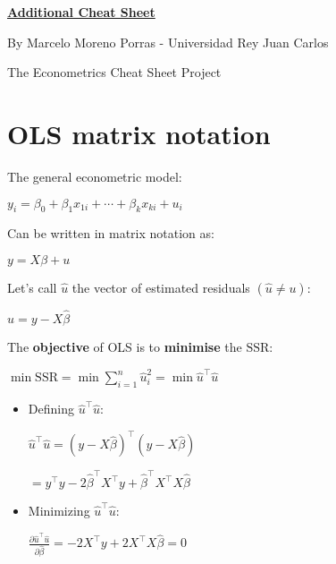 \documentclass[10pt, a4paper, landscape]{article}
\newcommand{\SSR}{\text{SSR}}
\begin{document}
\begin{multicols}{3}

\begin{center}
	\textbf{\LARGE \href{https://github.com/marcelomijas/econometrics-cheatsheet}{Additional Cheat Sheet}}

	{\footnotesize By Marcelo Moreno Porras - Universidad Rey Juan Carlos}

	{\footnotesize The Econometrics Cheat Sheet Project}
\end{center}

\section*{OLS matrix notation}

The general econometric model:

\begin{center}
	\( y_{i} = \beta_{0} + \beta_{1} x_{1i} + \cdots + \beta_{k} x_{ki} + u_{i} \)
\end{center}

Can be written in matrix notation as:

\begin{center}
	\( y = X \beta + u \)
\end{center}

Let's call \( \hat{u} \) the vector of estimated residuals \( (\hat{u} \neq u) \):

\begin{center}
	\( \hat{u} = y - X \hat{\beta} \)
\end{center}

The \textbf{objective} of OLS is to \textbf{minimise} the \( \SSR \):

\begin{center}
	\( \min \SSR = \min \sum_{i = 1}^{n} \hat{u}_{i}^{2} = \min \hat{u}^{\top} \hat{u} \)
\end{center}

\begin{itemize}[leftmargin=*]
	\item Defining \( \hat{u}^{\top} \hat{u} \):
	\begin{center}
		\( \hat{u}^{\top} \hat{u} = (y - X \hat{\beta})^{\top} (y - X \hat{\beta}) \)

		\( = y^{\top} y - 2 \hat{\beta}^{\top} X^{\top} y + \hat{\beta}^{\top} X^{\top} X \hat{\beta} \)
	\end{center}
	\item Minimizing \( \hat{u}^{\top} \hat{u} \):
	\begin{center}
		\( \frac{\partial \hat{u}^{\top} \hat{u}}{\partial \hat{\beta}} = -2 X^{\top} y + 2 X^{\top} X \hat{\beta} = 0 \)


\end{center}
\end{itemize}
\end{multicols}
\end{document}
